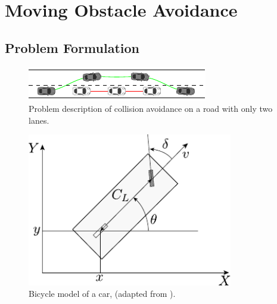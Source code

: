 \chapter{Moving Obstacle Avoidance}

\section{Problem Formulation}
\begin{figure}[!h]
	\centering
	\includegraphics[width=\textwidth]{../figure/obstacleAvoidance/obstacleAvoidance.pdf}
	\caption{Problem description of collision avoidance on a road with only two lanes.}
	\label{fig:obstacleAvoidance}
\end{figure}
\begin{figure}[!h]
	\centering
	\includegraphics[width=0.80\textwidth]{../figure/car_model.pdf}
	\caption{Bicycle model of a car, (adapted from \cite{siciliano}).}
	\label{fig:car_model}
\end{figure}
